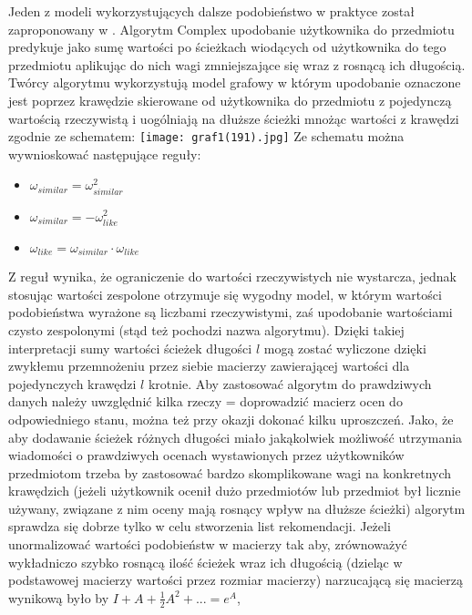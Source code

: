 \documentclass{pracamgr}
\begin{document}
    Jeden z modeli wykorzystujących dalsze podobieństwo w praktyce został zaproponowany w \cite{205}. Algorytm Complex upodobanie użytkownika do przedmiotu
    predykuje jako sumę wartości po ścieżkach wiodących od użytkownika do tego przedmiotu aplikując do nich wagi zmniejszające się wraz z rosnącą ich długością.
    Twórcy algorytmu wykorzystują model grafowy w którym upodobanie oznaczone jest poprzez krawędzie skierowane
    od użytkownika do przedmiotu z pojedynczą wartością rzeczywistą i uogólniają na dłuższe ścieżki mnożąc wartości z krawędzi zgodnie ze schematem:\newline
     \texttt{[image: graf1(191).jpg]}\newline
    Ze schematu można wywnioskować następujące reguły:
    \begin{itemize}\itemsep1pt \parskip0pt 
     \item $\omega_{similar}=\omega^2_{similar}$    
     \item $\omega_{similar}=-\omega^2_{like}$
     \item $\omega_{like}=\omega_{similar}\cdot\omega_{like}$
    \end{itemize}
    Z reguł wynika, że ograniczenie do wartości rzeczywistych nie wystarcza, jednak stosując wartości zespolone otrzymuje się wygodny model,
    w którym wartości podobieństwa wyrażone są liczbami rzeczywistymi, zaś upodobanie wartościami czysto zespolonymi (stąd też pochodzi nazwa algorytmu).
    Dzięki takiej interpretacji sumy wartości ścieżek długości $l$ mogą zostać wyliczone dzięki zwykłemu przemnożeniu przez siebie macierzy zawierającej
    wartości dla pojedynczych krawędzi $l$ krotnie.\newline
    Aby zastosować algorytm do prawdziwych danych należy uwzględnić kilka rzeczy = doprowadzić macierz ocen do odpowiedniego stanu,
    można też przy okazji dokonać kilku uproszczeń.
    Jako, że aby dodawanie ścieżek różnych długości miało jakąkolwiek możliwość utrzymania wiadomości
    o prawdziwych ocenach wystawionych przez użytkowników przedmiotom trzeba by zastosować bardzo skomplikowane wagi na konkretnych krawędzich
    (jeżeli użytkownik ocenił dużo przedmiotów lub przedmiot był licznie używany, związane z nim oceny mają rosnący wpływ na dłuższe ścieżki)
    algorytm sprawdza się dobrze tylko w celu stworzenia list rekomendacji.
    Jeżeli unormalizować wartości podobieństw w macierzy tak aby, zrównoważyć wykładniczo szybko rosnącą ilość ścieżek wraz ich długością
    (dzieląc w podstawowej macierzy wartości przez rozmiar macierzy) narzucającą się macierzą wynikową było by $I+A+\frac{1}{2}A^2+...=e^{A}$,
\end{document}
